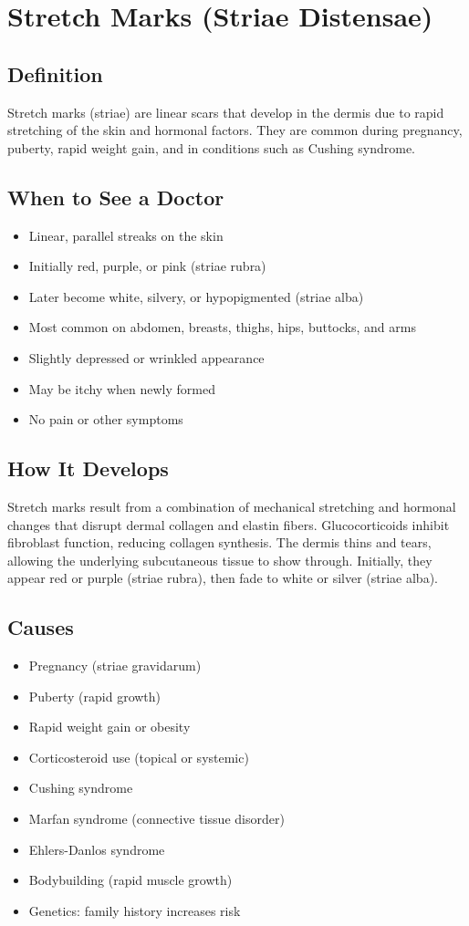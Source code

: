 \chapter{Stretch Marks (Striae Distensae)}

\section*{Definition}
Stretch marks (striae) are linear scars that develop in the dermis due to rapid stretching of the skin and hormonal factors. They are common during pregnancy, puberty, rapid weight gain, and in conditions such as Cushing syndrome.

\section*{When to See a Doctor}
\begin{itemize}
\item Linear, parallel streaks on the skin
\item Initially red, purple, or pink (striae rubra)
\item Later become white, silvery, or hypopigmented (striae alba)
\item Most common on abdomen, breasts, thighs, hips, buttocks, and arms
\item Slightly depressed or wrinkled appearance
\item May be itchy when newly formed
\item No pain or other symptoms
\end{itemize}

\section*{How It Develops}
Stretch marks result from a combination of mechanical stretching and hormonal changes that disrupt dermal collagen and elastin fibers. Glucocorticoids inhibit fibroblast function, reducing collagen synthesis. The dermis thins and tears, allowing the underlying subcutaneous tissue to show through. Initially, they appear red or purple (striae rubra), then fade to white or silver (striae alba).

\section*{Causes}
\begin{itemize}
\item Pregnancy (striae gravidarum)
\item Puberty (rapid growth)
\item Rapid weight gain or obesity
\item Corticosteroid use (topical or systemic)
\item Cushing syndrome
\item Marfan syndrome (connective tissue disorder)
\item Ehlers-Danlos syndrome
\item Bodybuilding (rapid muscle growth)
\item Genetics: family history increases risk
\end{itemize}

